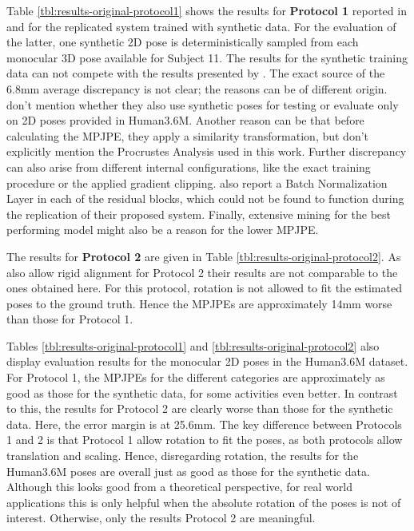 



Table \ref{tbl:results-original-protocol1} shows the results for \textbf{Protocol 1} reported in \cite{drover18} and for the replicated system trained with synthetic data.
For the evaluation of the latter, one synthetic 2D pose is deterministically sampled from each monocular 3D pose available for Subject 11.
The results for the synthetic training data can not compete with the results presented by \citet{drover18}.
The exact source of the 6.8mm average discrepancy is not clear; the reasons can be of different origin.
\citet{drover18} don't mention whether they also use synthetic poses for testing or evaluate only on 2D poses provided in Human3.6M.
Another reason can be that before calculating the MPJPE, they apply a similarity transformation, but don't explicitly mention the Procrustes Analysis used in this work.
Further discrepancy can also arise from different internal configurations, like the exact training procedure or the applied gradient clipping.
\citet{drover18} also report a Batch Normalization Layer in each of the residual blocks, which could not be found to function during the replication of their proposed system.
Finally, extensive mining for the best performing model might also be a reason for the lower MPJPE.

The results for \textbf{Protocol 2} are given in Table \ref{tbl:results-original-protocol2}.
As \citet{drover18} also allow rigid alignment for Protocol 2 their results are not comparable to the ones obtained here.
For this protocol, rotation is not allowed to fit the estimated poses to the ground truth.
Hence the MPJPEs are approximately 14mm worse than those for Protocol 1.

Tables \ref{tbl:results-original-protocol1} and \ref{tbl:results-original-protocol2} also display evaluation results for the monocular 2D poses in the Human3.6M dataset.
For Protocol 1, the MPJPEs for the different categories are approximately as good as those for the synthetic data, for some activities even better.
In contrast to this, the results for Protocol 2 are clearly worse than those for the synthetic data.
Here, the error margin is at 25.6mm.
The key difference between Protocols 1 and 2 is that Protocol 1 allow rotation to fit the poses, as both protocols allow translation and scaling.
Hence, disregarding rotation, the results for the Human3.6M poses are overall just as good as those for the synthetic data.
Although this looks good from a theoretical perspective, for real world applications this is only helpful when the absolute rotation of the poses is not of interest.
Otherwise, only the results Protocol 2 are meaningful.

